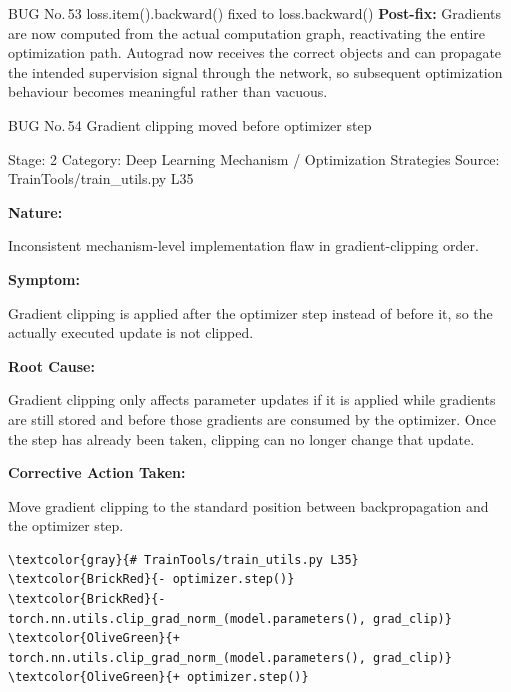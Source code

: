 \documentclass[10pt]{article}
\newcommand{\FieldLabel}[1]{%
 {\bfseries #1:}\par
}
\begin{document}
\begin{bugbox}{BUG No.\,53 \quad loss.item().backward() fixed to loss.backward()}
\textbf{Post-fix:} Gradients are now computed from the actual computation graph, reactivating the entire optimization path. Autograd now receives the correct objects and can propagate the intended supervision signal through the network, so subsequent optimization behaviour becomes meaningful rather than vacuous.
\par
\vspace{0.35em}
\end{bugbox}

\begin{bugbox}{BUG No.\,54 \quad Gradient clipping moved before optimizer step}
{\color{MetaGray}\small Stage: 2 \;\textbar\; Category: Deep Learning Mechanism / Optimization Strategies \;\textbar\; Source: TrainTools/train\_utils.py L35\par}
\vspace{0.22em}
\FieldLabel{Nature}
Inconsistent mechanism-level implementation flaw in gradient-clipping order.
\par
\vspace{0.35em}
\FieldLabel{Symptom}
Gradient clipping is applied after the optimizer step instead of before it, so the actually executed update is not clipped.
\par
\vspace{0.35em}
\FieldLabel{Root Cause}
Gradient clipping only affects parameter updates if it is applied while gradients are still stored and before those gradients are consumed by the optimizer. Once the step has already been taken, clipping can no longer change that update.
\par
\vspace{0.35em}
\FieldLabel{Corrective Action Taken}
Move gradient clipping to the standard position between backpropagation and the optimizer step.
\par
\vspace{0.35em}
\begin{Verbatim}[commandchars=\\\{\},fontsize=\footnotesize,breaklines=true,breaksymbol={},frame=leftline,framerule=2pt,rulecolor=\color{gray!40},xleftmargin=6pt,formatcom=\singlespacing]
\textcolor{gray}{# TrainTools/train_utils.py L35}
\textcolor{BrickRed}{- optimizer.step()}
\textcolor{BrickRed}{- torch.nn.utils.clip_grad_norm_(model.parameters(), grad_clip)}
\textcolor{OliveGreen}{+ torch.nn.utils.clip_grad_norm_(model.parameters(), grad_clip)}
\textcolor{OliveGreen}{+ optimizer.step()}
\end{Verbatim}
\vspace{0.22em}

\end{bugbox}
\end{document}
